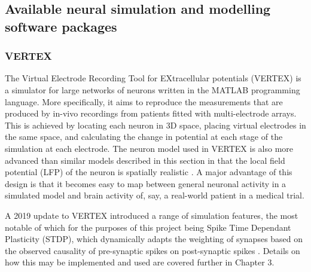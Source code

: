 \autocite{brette_simulation_2007}


\subsection{Available neural simulation and modelling software packages}

\subsubsection{VERTEX}
The Virtual Electrode Recording Tool for EXtracellular potentials (VERTEX) is a
simulator for large networks of neurons written in the MATLAB programming
language. More specifically, it aims to reproduce the measurements that are
produced by in-vivo recordings from patients fitted with multi-electrode
arrays. This is achieved by locating each neuron in 3D space, placing virtual
electrodes in the same space, and calculating the change in potential at each
stage of the simulation at each electrode. The neuron model used in VERTEX is
also more advanced than similar models described in this section in that the
local field potential (LFP) of the neuron is spatially realistic
\autocite{tomsett_virtual_2015}. A major advantage of this design is that it
becomes easy to map between general neuronal activity in a simulated model and
brain activity of, say, a real-world patient in a medical trial.

A 2019 update to VERTEX introduced a range of simulation features, the most
notable of which for the purposes of this project being Spike Time Dependant
Plasticity (STDP), which dynamically adapts the weighting of synapses based on
the observed causality of pre-synaptic spikes on post-synaptic spikes
\autocite{thornton_virtual_2019}. Details on how this may be implemented and
used are covered further in Chapter 3.


